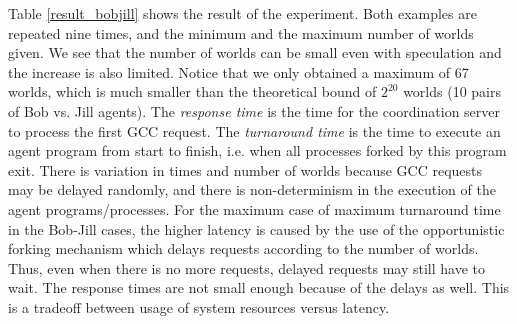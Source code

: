 \documentclass[preprint,10pt]{sigplanconf}
\begin{document}
Table \ref{result_bobjill} shows the result of the experiment. 
Both examples are repeated nine times, and the minimum and the maximum 
number of worlds given.  
We see that the number of worlds can be small even with speculation
and the increase is also limited.
Notice that we only obtained a maximum of 67 worlds,
which is much smaller than the theoretical bound
of $2^{20}$ worlds (10 pairs of Bob vs. Jill agents).
The \emph{response time} is the time for the coordination server 
to process the first GCC request. 
The \emph{turnaround time} is the time to execute an agent program from 
start to finish, i.e. when all processes forked by this program exit.
There is variation in times and number of worlds
because GCC requests may be delayed randomly, 
and there is non-determinism in the execution of the agent programs/processes.
For the maximum case of maximum turnaround time in the Bob-Jill cases, 
the higher latency is caused by the use of the opportunistic forking mechanism 
which delays requests according to the number of worlds. 
Thus, even when there is no more requests, 
delayed requests may still have to wait.
The response times are not small enough because of the delays as well.
This is a tradeoff between usage of system resources versus latency.
\end{document}
